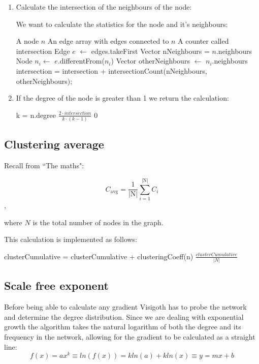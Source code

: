 \documentclass[a4paper,11pt,titlepage]{article}
\begin{document}
\begin{enumerate}
\item Calculate the intersection of the neighbours of the node:

We want to calculate the statistics for the node and it's neighbours:

\begin{algorithmic}
  \REQUIRE A node $n$
  \REQUIRE An edge array with edges connected to $n$
  \REQUIRE A counter called intersection
    \STATE Edge $e$ $\gets$ edges.takeFirst
    \STATE Vector nNeighbours = $n$.neighbours
    \STATE Node $n_i \gets$ $e$.differentFrom($n_i$)
    \STATE Vector otherNeighbours $\gets$ $n_i$.neighbours
    \STATE intersection = intersection + intersectionCount(nNeighbours, otherNeighbours);
  \ENDWHILE
\end{algorithmic}

\item If the degree of the node is greater than 1 we return the calculation:

\begin{algorithmic}
  \REQUIRE k = n.degree
    \RETURN $\frac{2 \cdot intersection}{k \cdot (k-1)}$
  \ELSE
    \RETURN $0$
  \ENDIF
\end{algorithmic}

\end{enumerate}

\subsection{Clustering average}

Recall from ``The maths":

\[ C_\mathrm{avg} =
   \frac{1}{\mathrm{|N|}}\sum_{i=1}^{\mathrm{|N|}} C_i
\],

where \(N\) is the total number of nodes in the graph.

This calculation is implemented as follows:

\begin{algorithmic}
    \STATE clusterCumulative = clusterCumulative + clusteringCoeff(n)
  \ENDFOR
  \RETURN $\frac{clusterCumulative}{|N|}$
\end{algorithmic}


\subsection{Scale free exponent}
Before being able to calculate any gradient Visigoth has to probe the network
and determine the degree distribution. Since we are dealing with exponential
growth the algorithm takes the natural logarithm of both the degree and its
frequency in the network, allowing for the gradient to be calculated as a
straight line:
\[ f(x) = ax^k \equiv ln(f(x)) = kln(a) + kln(x) \equiv y = mx + b \]
\end{document}
